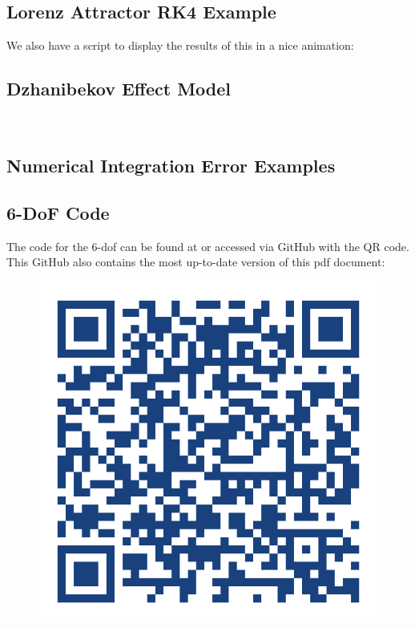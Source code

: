 \documentclass[12pt]{report}
\begin{document}
\subsection{Lorenz Attractor RK4 Example}\label{sec:Lorenz Attractor RK4 Example}
\label{code:Lorenz}

We also have a script to display the results of this in a nice animation:

\label{code:LorenzAnim}
\subsection{Dzhanibekov Effect Model}
\label{code:DzhanMain}

\label{code:DzhanInt}

\label{code:DzhanRotVis}\


\subsection{Numerical Integration Error Examples}
\label{code:Numerical Error $y'=2t$}

\label{code:Numerical Error y'=cos(4*pi*t)}
\subsection{6-DoF Code}
The code for the 6-\gls{dof} can be found at \cite{reynolds_hudsonreynoldsflight-dynamics-bible_2025} or accessed via GitHub with the QR code. This GitHub also contains the most up-to-date version of this pdf document:

\begin{figure}[ht]
    \centering
    \includegraphics[width=0.5\linewidth]{Images/adobe-express-qr-code(1).png}
    \label{fig:qr code}
\end{figure}

\printglossary[title=Special Terms, toctitle = Special Terms]

\printbibliography[heading=bibintoc, title={References}]
\end{document}
